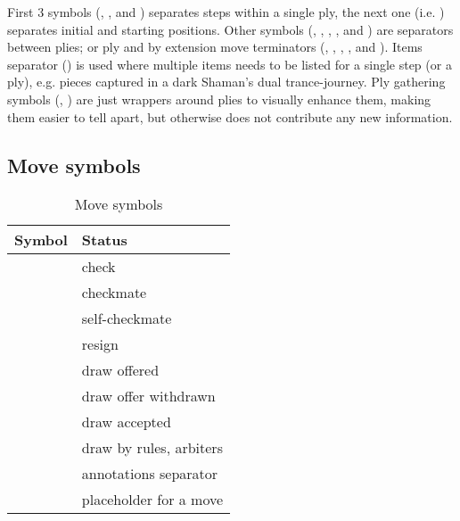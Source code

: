 First 3 symbols (, , and \alg{-}) separates steps within a single ply,
the next one (i.e. \alg{\textbackslash}) separates initial and starting positions.
Other symbols (\alg{\textasciitilde{}}, \alg{|}, , \alg{;;}, and ) are
separators between plies; or ply and \textendash{}by extension\textendash{} move
terminators (\alg{||}, \alg{|||}, , , and ).\newline
\indent
Items separator (\alg{,}) is used where multiple items needs to be listed for a single
step (or a ply), e.g. pieces captured in a dark Shaman's dual trance-journey.\newline
\indent
Ply gathering symbols (\alg{[}, \alg{]}) are just wrappers around plies to visually
enhance them, making them easier to tell apart, but otherwise does not contribute any
new information.

\clearpage %

\subsection*{Move symbols}
\label{sec:Appendix/Summary/Move symbols}

\begin{table}[!h]
\centering
\begin{tabular}{ rl }
\toprule %
\textbf{Symbol}      & \textbf{Status}                \\
\midrule %
\alg{+}              & check                          \\
\alg{\#}             & checkmate                      \\
\alg{\#}             & self-checkmate                 \\
\alg{\#\#}           & resign                         \\
\cmidrule{1-2} %
\alg{(=)}            & draw offered                   \\
\alg{()}             & draw offer withdrawn           \\
\alg{(==)}           & draw accepted                  \\
\alg{(===)}          & draw by rules, arbiters        \\
\cmidrule{1-2} %
\alg{\_}             & annotations separator          \\
\alg{...}            & placeholder for a move         \\
\bottomrule %
\end{tabular}
\caption{Move symbols}
\label{tbl:Appendix/Summary/Move symbols}
\end{table}

